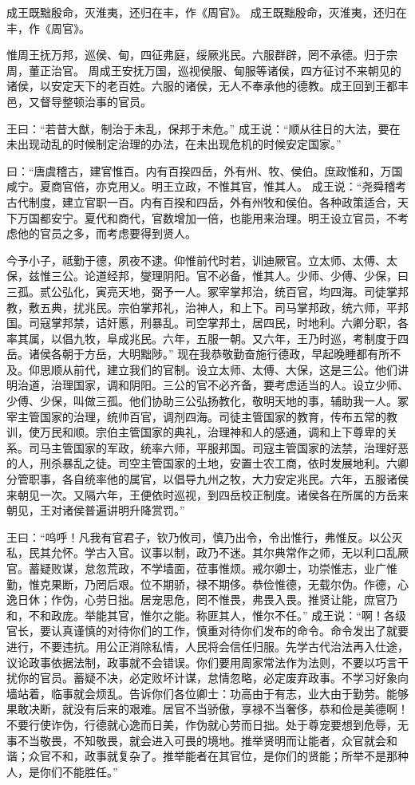\documentclass[a4paper,12pt,UTF8,twoside]{ctexbook}
\begin{document}
成王既黜殷命，灭淮夷，还归在丰，作《周官》。
成王既黜殷命，灭淮夷，还归在丰，作《周官》。

惟周王抚万邦，巡侯、甸，四征弗庭，绥厥兆民。六服群辟，罔不承德。归于宗周，董正治官。
周成王安抚万国，巡视侯服、甸服等诸侯，四方征讨不来朝见的诸侯，以安定天下的老百姓。六服的诸侯，无人不奉承他的德教。成王回到王都丰邑，又督导整顿治事的官员。

王曰：“若昔大猷，制治于未乱，保邦于未危。”
成王说：“顺从往日的大法，要在未出现动乱的时候制定治理的办法，在未出现危机的时候安定国家。”

曰：“唐虞稽古，建官惟百。内有百揆四岳，外有州、牧、侯伯。庶政惟和，万国咸宁。夏商官倍，亦克用乂。明王立政，不惟其官，惟其人。
成王说：“尧舜稽考古代制度，建立官职一百。内有百揆和四岳，外有州牧和侯伯。各种政策适合，天下万国都安宁。夏代和商代，官数增加一倍，也能用来治理。明王设立官员，不考虑他的官员之多，而考虑要得到贤人。

今予小子，祗勤于德，夙夜不逮。仰惟前代时若，训迪厥官。立太师、太傅、太保，兹惟三公。论道经邦，燮理阴阳。官不必备，惟其人。少师、少傅、少保，曰三孤。贰公弘化，寅亮天地，弼予一人。冢宰掌邦治，统百官，均四海。司徒掌邦教，敷五典，扰兆民。宗伯掌邦礼，治神人，和上下。司马掌邦政，统六师，平邦国。司寇掌邦禁，诘奸慝，刑暴乱。司空掌邦土，居四民，时地利。六卿分职，各率其属，以倡九牧，阜成兆民。六年，五服一朝。又六年，王乃时巡，考制度于四岳。诸侯各朝于方岳，大明黜陟。”
现在我恭敬勤奋施行德政，早起晚睡都有所不及。仰思顺从前代，建立我们的官制。设立太师、太傅、大保，这是三公。他们讲明治道，治理国家，调和阴阳。三公的官不必齐备，要考虑适当的人。设立少师、少傅、少保，叫做三孤。他们协助三公弘扬教化，敬明天地的事，辅助我一人。冢宰主管国家的治理，统帅百官，调剂四海。司徒主管国家的教育，传布五常的教训，使万民和顺。宗伯主管国家的典礼，治理神和人的感通，调和上下尊卑的关系。司马主管国家的军政，统率六师，平服邦国。司寇主管国家的法禁，治理好恶的人，刑杀暴乱之徒。司空主管国家的土地，安置士农工商，依时发展地利。六卿分管职事，各自统率他的属官，以倡导九州之牧，大力安定兆民。六年，五服诸侯来朝见一次。又隔六年，王便依时巡视，到四岳校正制度。诸侯各在所属的方岳来朝见，王对诸侯普遍讲明升降赏罚。”

王曰：“呜呼！凡我有官君子，钦乃攸司，慎乃出令，令出惟行，弗惟反。以公灭私，民其允怀。学古入官。议事以制，政乃不迷。其尔典常作之师，无以利口乱厥官。蓄疑败谋，怠忽荒政，不学墙面，莅事惟烦。戒尔卿士，功崇惟志，业广惟勤，惟克果断，乃罔后艰。位不期骄，禄不期侈。恭俭惟德，无载尔伪。作德，心逸日休；作伪，心劳日拙。居宠思危，罔不惟畏，弗畏入畏。推贤让能，庶官乃和，不和政庞。举能其官，惟尔之能。称匪其人，惟尔不任。”
成王说：“啊！各级官长，要认真谨慎的对待你们的工作，慎重对待你们发布的命令。命令发出了就要进行，不要违抗。用公正消除私情，人民将会信任归服。先学古代治法再入仕途，议论政事依据法制，政事就不会错误。你们要用周家常法作为法则，不要以巧言干扰你的官员。蓄疑不决，必定败坏计谋，怠情忽略，必定废弃政事。不学习好象向墙站着，临事就会烦乱。告诉你们各位卿士：功高由于有志，业大由于勤劳。能够果敢决断，就没有后来的艰难。居官不当骄傲，享禄不当奢侈，恭和俭是美德啊！不要行使诈伪，行德就心逸而日美，作伪就心劳而日拙。处于尊宠要想到危辱，无事不当敬畏，不知敬畏，就会进入可畏的境地。推举贤明而让能者，众官就会和谐；众官不和，政事就复杂了。推举能者在其官位，是你们的贤能；所举不是那种人，是你们不能胜任。”
\end{document}
